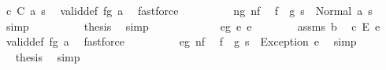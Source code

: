 \begin{isabellebody}
\ c{\isacharcolon}{\kern0pt}\ {\isachardoublequoteopen}C\ a{\isacharprime}{\kern0pt}\ s{\isacharprime}{\kern0pt}{\isacharprime}{\kern0pt}{\isachardoublequoteclose}\ \isamarkupfalse%
\ valid{\isacharunderscore}{\kern0pt}def{\isacharbrackleft}{\kern0pt}\ {\isacharquery}{\kern0pt}f{\isacharequal}{\kern0pt}{\isachardoublequoteopen}g\ a{\isachardoublequoteclose}{\isacharbrackright}{\kern0pt}\ \isamarkupfalse%
\ fastforce\isanewline
\ \ \ \ \ \ \isamarkupfalse%
\ \isamarkupfalse%
\ ng\ nf\ \isamarkupfalse%
\ {\isachardoublequoteopen}{\isacharparenleft}{\kern0pt}f\ {\isasymbind}\ g{\isacharparenright}{\kern0pt}\ s\ {\isacharequal}{\kern0pt}\ Normal\ {\isacharparenleft}{\kern0pt}a{\isacharprime}{\kern0pt}{\isacharcomma}{\kern0pt}\ s{\isacharprime}{\kern0pt}{\isacharprime}{\kern0pt}{\isacharparenright}{\kern0pt}{\isachardoublequoteclose}\ \isamarkupfalse%
\ simp\isanewline
\ \ \ \ \ \ \isamarkupfalse%
\ \isamarkupfalse%
\ {\isacharquery}{\kern0pt}thesis\ \isamarkupfalse%
\ simp\isanewline
\ \ \ \ \isamarkupfalse%
\isanewline
\ \ \ \ \ \ \isamarkupfalse%
\ eg{\isacharcolon}{\kern0pt}\ {\isacharparenleft}{\kern0pt}e\ e{\isacharparenright}{\kern0pt}\isanewline
\ \ \ \ \ \ \isamarkupfalse%
\ assms{\isacharparenleft}{\kern0pt}{}{\isacharparenright}{\kern0pt}\ b\ \isamarkupfalse%
\ c{\isacharcolon}{\kern0pt}\ {\isachardoublequoteopen}E\ e{\isachardoublequoteclose}\ \isamarkupfalse%
\ valid{\isacharunderscore}{\kern0pt}def{\isacharbrackleft}{\kern0pt}\ {\isacharquery}{\kern0pt}f{\isacharequal}{\kern0pt}{\isachardoublequoteopen}g\ a{\isachardoublequoteclose}{\isacharbrackright}{\kern0pt}\ \isamarkupfalse%
\ fastforce\isanewline
\ \ \ \ \ \ \isamarkupfalse%
\ \isamarkupfalse%
\ eg\ nf\ \isamarkupfalse%
\ {\isachardoublequoteopen}{\isacharparenleft}{\kern0pt}f\ {\isasymbind}\ g{\isacharparenright}{\kern0pt}\ s\ {\isacharequal}{\kern0pt}\ Exception\ e{\isachardoublequoteclose}\ \isamarkupfalse%
\ simp\isanewline
\ \ \ \ \ \ \isamarkupfalse%
\ \isamarkupfalse%
\ {\isacharquery}{\kern0pt}thesis\ \isamarkupfalse%
\ simp\isanewline
\ \ \ \ \isamarkupfalse%
\isanewline
\ \ \isamarkupfalse%
\isanewline
\ \ \ \ \isamarkupfalse%

\end{isabellebody}
